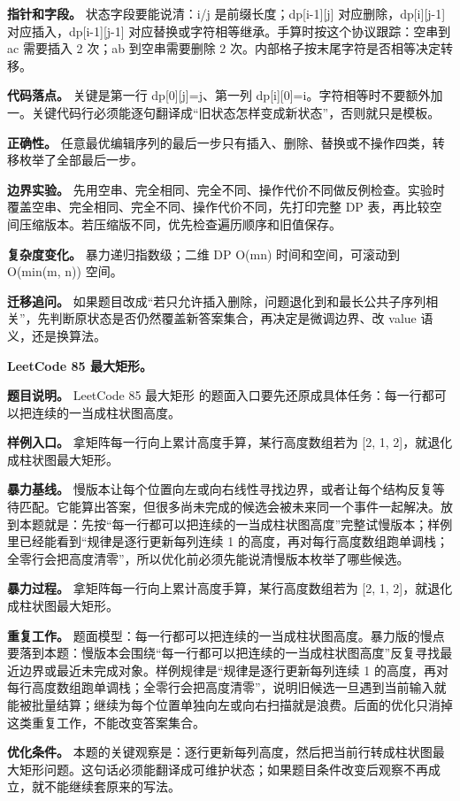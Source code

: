 \textbf{指针和字段。} 状态字段要能说清：i/j 是前缀长度；dp[i-1][j] 对应删除，dp[i][j-1] 对应插入，dp[i-1][j-1] 对应替换或字符相等继承。手算时按这个协议跟踪：空串到 ac 需要插入 2 次；ab 到空串需要删除 2 次。内部格子按末尾字符是否相等决定转移。

\textbf{代码落点。} 关键是第一行 dp[0][j]=j、第一列 dp[i][0]=i。字符相等时不要额外加一。关键代码行必须能逐句翻译成“旧状态怎样变成新状态”，否则就只是模板。

\textbf{正确性。} 任意最优编辑序列的最后一步只有插入、删除、替换或不操作四类，转移枚举了全部最后一步。

\textbf{边界实验。} 先用空串、完全相同、完全不同、操作代价不同做反例检查。实验时覆盖空串、完全相同、完全不同、操作代价不同，先打印完整 DP 表，再比较空间压缩版本。若压缩版不同，优先检查遍历顺序和旧值保存。

\textbf{复杂度变化。} 暴力递归指数级；二维 DP O(mn) 时间和空间，可滚动到 O(min(m, n)) 空间。

\textbf{迁移追问。} 如果题目改成“若只允许插入删除，问题退化到和最长公共子序列相关”，先判断原状态是否仍然覆盖新答案集合，再决定是微调边界、改 value 语义，还是换算法。

\noindent\textbf{LeetCode 85 最大矩形。}

\textbf{题目说明。} LeetCode 85 最大矩形 的题面入口要先还原成具体任务：每一行都可以把连续的一当成柱状图高度。

\textbf{样例入口。} 拿矩阵每一行向上累计高度手算，某行高度数组若为 [2, 1, 2]，就退化成柱状图最大矩形。

\textbf{暴力基线。} 慢版本让每个位置向左或向右线性寻找边界，或者让每个结构反复等待匹配。它能算出答案，但很多尚未完成的候选会被未来同一个事件一起解决。放到本题就是：先按“每一行都可以把连续的一当成柱状图高度”完整试慢版本；样例里已经能看到“规律是逐行更新每列连续 1 的高度，再对每行高度数组跑单调栈；全零行会把高度清零”，所以优化前必须先能说清慢版本枚举了哪些候选。

\textbf{暴力过程。} 拿矩阵每一行向上累计高度手算，某行高度数组若为 [2, 1, 2]，就退化成柱状图最大矩形。

\textbf{重复工作。} 题面模型：每一行都可以把连续的一当成柱状图高度。暴力版的慢点要落到本题：慢版本会围绕“每一行都可以把连续的一当成柱状图高度”反复寻找最近边界或最近未完成对象。样例规律是“规律是逐行更新每列连续 1 的高度，再对每行高度数组跑单调栈；全零行会把高度清零”，说明旧候选一旦遇到当前输入就能被批量结算；继续为每个位置单独向左或向右扫描就是浪费。后面的优化只消掉这类重复工作，不能改变答案集合。

\textbf{优化条件。} 本题的关键观察是：逐行更新每列高度，然后把当前行转成柱状图最大矩形问题。这句话必须能翻译成可维护状态；如果题目条件改变后观察不再成立，就不能继续套原来的写法。

